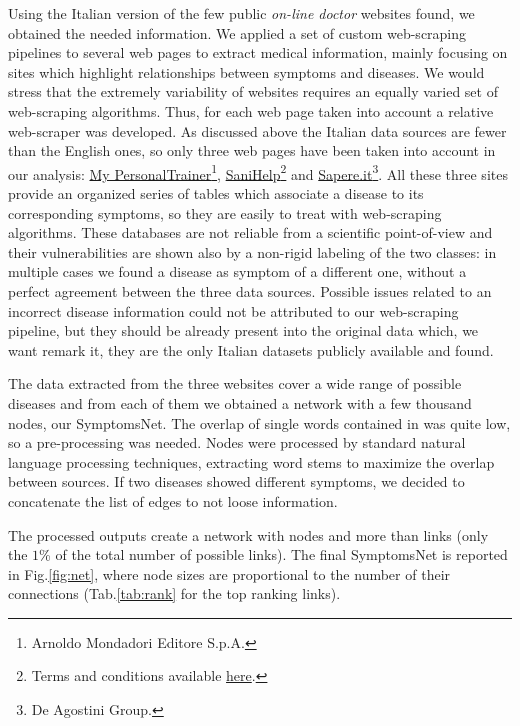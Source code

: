 \documentclass{standalone}
\begin{document}
Using the Italian version of the few public \emph{on-line doctor} websites found, we obtained the needed information.
We applied a set of custom \textsf{web-scraping} pipelines to several web pages to extract medical information, mainly focusing on sites which highlight relationships between symptoms and diseases.
We would stress that the extremely variability of websites requires an equally varied set of \textsf{web-scraping} algorithms.
Thus, for each web page taken into account a relative web-scraper was developed.
As discussed above the Italian data sources are fewer than the English ones, so only three web pages have been taken into account in our analysis: \href{https://m.my-personaltrainer.it/}{My PersonalTrainer}\footnote{
  Arnoldo Mondadori Editore S.p.A.
}, \href{http://www.sanihelp.it/}{SaniHelp}\footnote{
  Terms and conditions available \href{https://www.iubenda.com/terms-and-conditions/210132}{here}.
} and \href{http://www.sapere.it/}{Sapere.it}\footnote{
  De Agostini Group.
}.
All these three sites provide an organized series of tables which associate a disease to its corresponding symptoms, so they are easily to treat with \textsf{web-scraping} algorithms.
These databases are not reliable from a scientific point-of-view and their vulnerabilities are shown also by a non-rigid labeling of the two classes: in multiple cases we found a disease as symptom of a different one, without a perfect agreement between the three data sources.
Possible issues related to an incorrect disease information could not be attributed to our \textsf{web-scraping} pipeline, but they should be already present into the original data which, we want remark it, they are the only Italian datasets publicly available and found.

The data extracted from the three websites cover a wide range of possible diseases and from each of them we obtained a network with a few thousand nodes, our \textsf{SymptomsNet}.
The overlap of single words contained in  was quite low, so a pre-processing was needed.
Nodes were processed by standard natural language processing techniques, extracting word stems to maximize the overlap between sources.
If two diseases showed different symptoms, we decided to concatenate the list of edges to not loose information.

The processed outputs create a network with  nodes and more than  links (only the $1$\% of the total number of possible links).
The final \textsf{SymptomsNet} is reported in Fig.\ref{fig:net}, where node sizes are proportional to the number of their connections (Tab.\ref{tab:rank} for the top ranking links).
\end{document}
